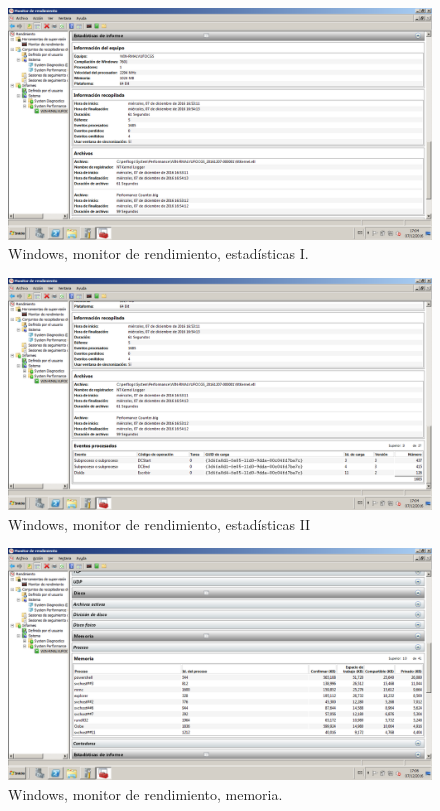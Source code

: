 \begin{figure}[H] 
	\centering
	\includegraphics[width=14.7cm]{./img/ejercicio4_2.png} 	
	\caption{Windows, monitor de rendimiento, estadísticas I.} \label{fig:ejercicio4_2}
\end{figure}

\begin{figure}[H] 
	\centering
	\includegraphics[width=14.7cm]{./img/ejercicio4_3.png} 	
	\caption{Windows, monitor de rendimiento, estadísticas II} \label{fig:ejercicio4_3}
\end{figure}

\begin{figure}[H] 
	\centering
	\includegraphics[width=14.7cm]{./img/ejercicio4_4.png} 	
	\caption{Windows, monitor de rendimiento, memoria.} \label{fig:ejercicio4_4}
\end{figure}

